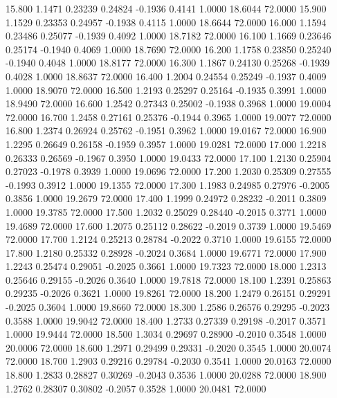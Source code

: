   15.800   1.1471   0.23239   0.24824  -0.1936   0.4141   1.0000  18.6044  72.0000
  15.900   1.1529   0.23353   0.24957  -0.1938   0.4115   1.0000  18.6644  72.0000
  16.000   1.1594   0.23486   0.25077  -0.1939   0.4092   1.0000  18.7182  72.0000
  16.100   1.1669   0.23646   0.25174  -0.1940   0.4069   1.0000  18.7690  72.0000
  16.200   1.1758   0.23850   0.25240  -0.1940   0.4048   1.0000  18.8177  72.0000
  16.300   1.1867   0.24130   0.25268  -0.1939   0.4028   1.0000  18.8637  72.0000
  16.400   1.2004   0.24554   0.25249  -0.1937   0.4009   1.0000  18.9070  72.0000
  16.500   1.2193   0.25297   0.25164  -0.1935   0.3991   1.0000  18.9490  72.0000
  16.600   1.2542   0.27343   0.25002  -0.1938   0.3968   1.0000  19.0004  72.0000
  16.700   1.2458   0.27161   0.25376  -0.1944   0.3965   1.0000  19.0077  72.0000
  16.800   1.2374   0.26924   0.25762  -0.1951   0.3962   1.0000  19.0167  72.0000
  16.900   1.2295   0.26649   0.26158  -0.1959   0.3957   1.0000  19.0281  72.0000
  17.000   1.2218   0.26333   0.26569  -0.1967   0.3950   1.0000  19.0433  72.0000
  17.100   1.2130   0.25904   0.27023  -0.1978   0.3939   1.0000  19.0696  72.0000
  17.200   1.2030   0.25309   0.27555  -0.1993   0.3912   1.0000  19.1355  72.0000
  17.300   1.1983   0.24985   0.27976  -0.2005   0.3856   1.0000  19.2679  72.0000
  17.400   1.1999   0.24972   0.28232  -0.2011   0.3809   1.0000  19.3785  72.0000
  17.500   1.2032   0.25029   0.28440  -0.2015   0.3771   1.0000  19.4689  72.0000
  17.600   1.2075   0.25112   0.28622  -0.2019   0.3739   1.0000  19.5469  72.0000
  17.700   1.2124   0.25213   0.28784  -0.2022   0.3710   1.0000  19.6155  72.0000
  17.800   1.2180   0.25332   0.28928  -0.2024   0.3684   1.0000  19.6771  72.0000
  17.900   1.2243   0.25474   0.29051  -0.2025   0.3661   1.0000  19.7323  72.0000
  18.000   1.2313   0.25646   0.29155  -0.2026   0.3640   1.0000  19.7818  72.0000
  18.100   1.2391   0.25863   0.29235  -0.2026   0.3621   1.0000  19.8261  72.0000
  18.200   1.2479   0.26151   0.29291  -0.2025   0.3604   1.0000  19.8660  72.0000
  18.300   1.2586   0.26576   0.29295  -0.2023   0.3588   1.0000  19.9042  72.0000
  18.400   1.2733   0.27339   0.29198  -0.2017   0.3571   1.0000  19.9444  72.0000
  18.500   1.3034   0.29697   0.28900  -0.2010   0.3548   1.0000  20.0006  72.0000
  18.600   1.2971   0.29499   0.29331  -0.2020   0.3545   1.0000  20.0074  72.0000
  18.700   1.2903   0.29216   0.29784  -0.2030   0.3541   1.0000  20.0163  72.0000
  18.800   1.2833   0.28827   0.30269  -0.2043   0.3536   1.0000  20.0288  72.0000
  18.900   1.2762   0.28307   0.30802  -0.2057   0.3528   1.0000  20.0481  72.0000
